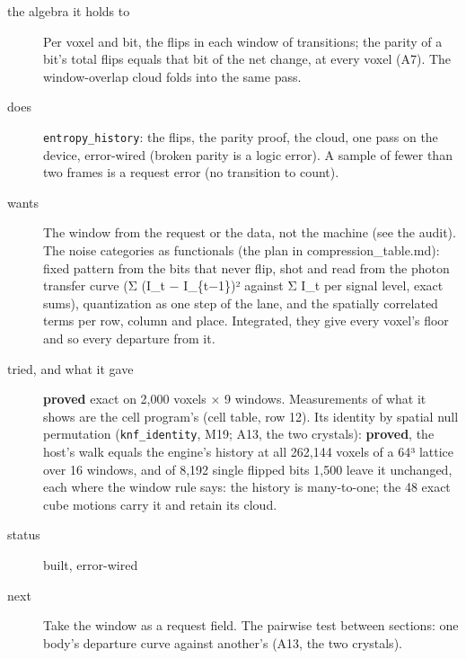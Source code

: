 \begin{description}
\item[{the algebra it holds to}] Per voxel and bit, the flips in each window of transitions; the parity of a bit's total flips equals that bit of the net change, at every voxel (A7). The window-overlap cloud folds into the same pass.
\item[{does}] \texttt{entropy\_\allowbreak{}history}: the flips, the parity proof, the cloud, one pass on the device, error-wired (broken parity is a logic error). A sample of fewer than two frames is a request error (no transition to count).
\item[{wants}] The window from the request or the data, not the machine (see the audit). The noise categories as functionals (the plan in compression\_\allowbreak{}table.md): fixed pattern from the bits that never flip, shot and read from the photon transfer curve (Σ (I\_\allowbreak{}t − I\_\allowbreak{}\{t−1\})² against Σ I\_\allowbreak{}t per signal level, exact sums), quantization as one step of the lane, and the spatially correlated terms per row, column and place. Integrated, they give every voxel's floor and so every departure from it.
\item[{tried, and what it gave}] \textbf{proved} exact on 2,000 voxels × 9 windows. Measurements of what it shows are the cell program's (cell table, row 12). Its identity by spatial null permutation (\texttt{knf\_\allowbreak{}identity}, M19; A13, the two crystals): \textbf{proved}, the host's walk equals the engine's history at all 262,144 voxels of a 64³ lattice over 16 windows, and of 8,192 single flipped bits 1,500 leave it unchanged, each where the window rule says: the history is many-to-one; the 48 exact cube motions carry it and retain its cloud.
\item[{status}] built, error-wired
\item[{next}] Take the window as a request field. The pairwise test between sections: one body's departure curve against another's (A13, the two crystals).
\end{description}

